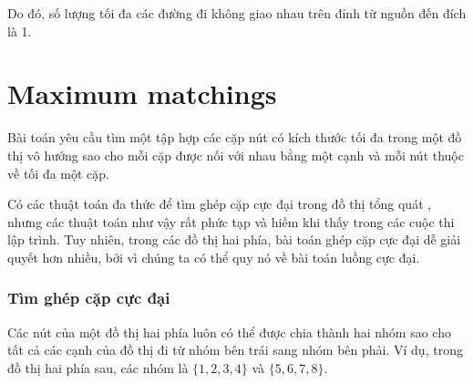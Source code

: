 Do đó, số lượng tối đa các đường đi không giao nhau trên đỉnh
từ nguồn đến đích là 1.

\section{Maximum matchings}


Bài toán  yêu cầu tìm
một tập hợp các cặp nút có kích thước tối đa trong một đồ thị vô hướng
sao cho mỗi cặp được nối với nhau bằng một cạnh và
mỗi nút thuộc về tối đa một cặp.

Có các thuật toán đa thức để tìm
ghép cặp cực đại trong đồ thị tổng quát \cite{edm65},
nhưng các thuật toán như vậy rất phức tạp và
hiếm khi thấy trong các cuộc thi lập trình.
Tuy nhiên, trong các đồ thị hai phía,
bài toán ghép cặp cực đại dễ giải quyết hơn nhiều,
bởi vì chúng ta có thể quy nó về
bài toán luồng cực đại.

\subsubsection{Tìm ghép cặp cực đại}

Các nút của một đồ thị hai phía luôn có thể được
chia thành hai nhóm sao cho tất cả các cạnh
của đồ thị đi từ nhóm bên trái sang nhóm bên phải.
Ví dụ, trong đồ thị hai phía sau,
các nhóm là $\{1,2,3,4\}$ và $\{5,6,7,8\}$.

